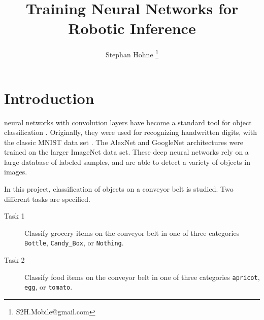 \documentclass[10pt, journal, compsoc]{IEEEtran}
\newcommand{\an}{AlexNet }
\newcommand{\gn}{GoogleNet }
\begin{document}
\title{Training Neural Networks for Robotic Inference}
\author{Stephan Hohne \thanks{S2H.Mobile@gmail.com}}

%
{}

\maketitle

\section{Introduction}
\label{sec:introduction}
 neural networks with convolution layers have become a standard tool for object classification  \cite{geron}. Originally, they were used for recognizing handwritten digits, with the classic MNIST data set \cite{lecun-98}. The \an \cite{NIPS2012_4824} and \gn \cite{DBLP:journals/corr/SzegedyLJSRAEVR14} architectures were trained on the larger ImageNet data set. These deep neural networks rely on a large database of labeled samples, and are able to detect a variety of objects in images. 

In this project, classification of objects on a conveyor belt is studied. Two different tasks are specified.
\begin{description}
\item[Task 1] Classify grocery items on the conveyor belt in one of three categories \texttt{Bottle}, \texttt{Candy\_Box}, or \texttt{Nothing}.
\item[Task 2] Classify food items on the conveyor belt in one of three categories \texttt{apricot}, \texttt{egg}, or \texttt{tomato}.
\end{description}
\end{document}
